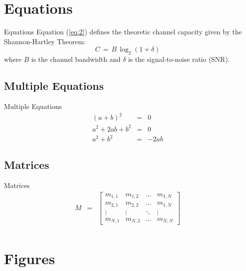 \documentclass[bigger,pdf]{beamer}
\begin{document}
\section{Equations}

\begin{frame}{Equations}
Equation (\ref{eq:2}) defines the theoretic channel capacity given by the Shannon-Hartley Theorem:
\begin{equation}\label{eq:2}
    C \, = \, B\,\log_2\left(1+\delta\right)
\end{equation}
\noindent where $B$ is the channel bandwidth and $\delta$ is the signal-to-noise ratio (SNR).
\end{frame}

\subsection{Multiple Equations}

\begin{frame}{Multiple Equations}
\begin{eqnarray}
    (a+b)^2 & = & 0 \\
    a^2 + 2ab + b^2 & = & 0 \nonumber \\
    a^2 + b^2 &=& -2ab 
\end{eqnarray}
\end{frame}

\subsection{Matrices}

\begin{frame}{Matrices}
\begin{eqnarray} M &=& \left[ {\begin{array}{cccc}
    m_{1,1} & m_{1,2} & \ldots & m_{1,N} \\
    m_{2,1} & m_{2,2} & \ldots & m_{1,N} \\
    \vdots & \vdots & \ddots & \vdots \\
    m_{N,1} & m_{N,2} & \ldots & m_{N,N}
\end{array}} \right] \\ \nonumber
\end{eqnarray}
\end{frame}

\section{Figures}
\end{document}
